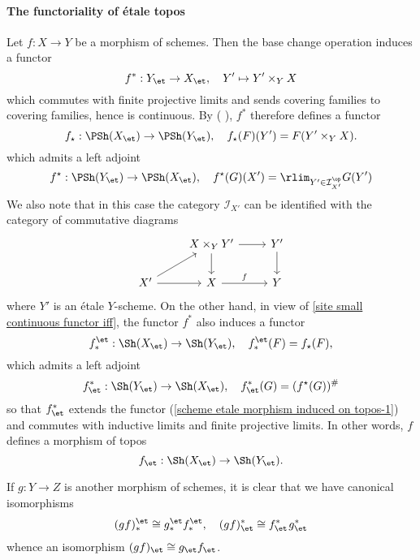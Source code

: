 \paragraph{The functoriality of \'etale topos}\label{scheme etale topos functoriality}
Let $f:X\to Y$ be a morphism of schemes. Then the base change operation induces a functor
\begin{equation}\label{scheme etale morphism induced on topos-1}
f^*:Y_\et\to X_\et,\quad Y'\mapsto Y'\times_YX
\end{equation}
which commutes with finite projective limits and sends covering families to covering families, hence is continuous. By (\cite{SGA4-1} ), $f^*$ therefore defines a functor
\[f_\star:\PSh(X_\et)\to\PSh(Y_\et),\quad f_\star(F)(Y')=F(Y'\times_YX).\]
which admits a left adjoint
\[f^\star:\PSh(Y_\et)\to\PSh(X_\et),\quad f^\star(G)(X')=\rlim_{Y'\in\mathcal{I}_{X'}^{\op}}G(Y')\]
We also note that in this case the category $\mathcal{I}_{X'}$ can be identified with the category of commutative diagrams
\[\begin{tikzcd}
&X\times_YY'\ar[r]\ar[d]&Y'\ar[d]\\
X'\ar[ru]\ar[r]&X\ar[r,"f"]&Y
\end{tikzcd}\]
where $Y'$ is an \'etale $Y$-scheme. On the other hand, in view of \cref{site small continuous functor iff}, the functor $f^*$ also induces a functor
\begin{equation}\label{scheme etale morphism induced on topos-2}
f_*^\et:\Sh(X_\et)\to\Sh(Y_\et),\quad f_*^\et(F)=f_\star(F),
\end{equation}
which admits a left adjoint
\begin{equation}\label{scheme etale morphism induced on topos-3}
f^*_\et:\Sh(Y_\et)\to\Sh(X_\et),\quad f^*_\et(G)=(f^\star(G))^\#
\end{equation}
so that $f^*_\et$ extends the functor (\ref{scheme etale morphism induced on topos-1}) and commutes with inductive limits and finite projective limits. In other words, $f$ defines a morphism of topos
\[f_\et:\Sh(X_\et)\to\Sh(Y_\et).\]

If $g:Y\to Z$ is another morphism of schemes, it is clear that we have canonical isomorphisms
\begin{equation}\label{scheme etale site inverse direct image functor transitive-1}
(gf)_*^\et\cong g_*^\et f_*^\et,\quad (gf)^*_\et\cong f_\et^*\hspace{1pt} g^*_\et
\end{equation}
whence an isomorphism $(gf)_\et\cong g_\et f_\et$.

